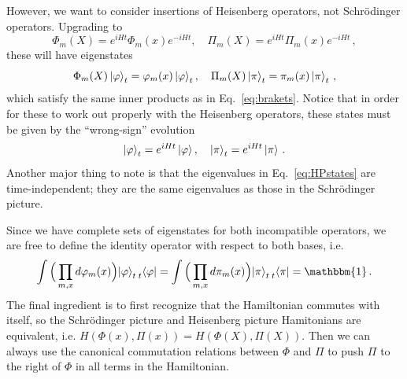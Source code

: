 \documentclass{article}
\numberwithin{equation}{subsection}
\begin{document}
However, we want to consider insertions of Heisenberg operators, not Schr\"odinger operators. Upgrading to
\begin{equation}
    \Phi_m(X) = e^{iHt}\Phi_m(x)e^{-iHt}, \quad \Pi_m(X) = e^{iHt}\Pi_m(x)e^{-iHt}\,,
\end{equation}
these will have eigenstates
\begin{equation}\label{eq:HPstates}
    \Phi_m(X)\ket{\varphi}_t = \varphi_m(x)\ket{\varphi}_t, \quad \Pi_m(X)\ket{\pi}_t = \pi_m(x)\ket{\pi}_t\,,
\end{equation}
which satisfy the same inner products as in Eq.~\eqref{eq:brakets}. Notice that in order for these to work out properly with the Heisenberg operators, these states must be 
given by the ``wrong-sign'' evolution
\begin{equation}
    \ket{\varphi}_t = e^{iHt}\ket{\varphi}, \quad \ket{\pi}_t = e^{iHt}\ket{\pi}\,.
\end{equation}
Another major thing to note is that the eigenvalues in Eq.~\eqref{eq:HPstates} are time-independent; they are the same eigenvalues as those in the Schr\"odinger picture.

Since we have complete sets of eigenstates for both incompatible operators, we are free to define the identity operator with respect to both bases, i.e.
\begin{equation}
    \int\Big(\prod_{m, x}d\varphi_m(x)\Big){\ket{\varphi}_t}\prescript{}{t}{\bra{\varphi}} = \int\Big(\prod_{m, x}d\pi_m(x)\Big){\ket{\pi}_t}\prescript{}{t}{\bra{\pi}} = \mathbbm{1}\,.
\end{equation}
The final ingredient is to first recognize that the Hamiltonian commutes with itself, so the Schr\"odinger picture and Heisenberg picture Hamitonians are equivalent, i.e. 
$H(\Phi(x), \Pi(x)) = H(\Phi(X), \Pi(X))$. Then we can always use the canonical commutation relations between $\Phi$ and $\Pi$ to push $\Pi$ to the right of $\Phi$ in all terms in the Hamiltonian.
\end{document}
